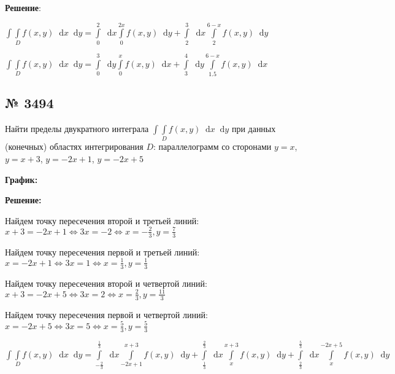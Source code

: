 \documentclass{article}
\newcommand*\diff{\mathop{}\!\mathrm{d}}
\begin{document}
\textbf{Решение}:

$\int\int\limits_{D} f(x, y) \diff x \diff y = \int\limits_{0}^{2} \diff x \int\limits_{0}^{2x} f(x, y) \diff y + \int\limits_{2}^{3} \diff x \int\limits_{2}^{6-x} f(x, y) \diff y$

$\int\int\limits_{D} f(x, y) \diff x \diff y = \int\limits_{0}^{3} \diff y \int\limits_{0}^{x} f(x, y) \diff x + \int\limits_{3}^{4} \diff y \int\limits_{1.5}^{6-x} f(x, y) \diff x$

\subsection{№ 3494}

Найти пределы двукратного интеграла $\int\int\limits_{D} f(x, y) \diff x \diff y$ при данных (конечных) областях интегрирования $D$: параллелограмм со сторонами $y = x$, $y = x + 3$, $y = -2x + 1$, $y = -2x + 5$

\textbf{График:}


\textbf{Решение:}

Найдем точку пересечения второй и третьей линий: $x + 3 = -2x + 1 \Longleftrightarrow 3x = -2 \Longleftrightarrow x = -\frac{2}{3}, y = \frac{7}{3}$

Найдем точку пересечения первой и третьей линий: $x = -2x + 1 \Longleftrightarrow 3x = 1 \Longleftrightarrow x = \frac{1}{3}, y = \frac{1}{3}$

Найдем точку пересечения второй и четвертой линий: $x + 3 = -2x + 5 \Longleftrightarrow 3x = 2 \Longleftrightarrow x = \frac{2}{3}, y = \frac{11}{3}$

Найдем точку пересечения первой и четвертой линий: $x = -2x + 5 \Longleftrightarrow 3x = 5 \Longleftrightarrow x = \frac{5}{3}, y = \frac{5}{3}$

$\int\int\limits_{D} f(x, y) \diff x \diff y = \int\limits_{-\frac{2}{3}}^{\frac{1}{3}} \diff x \int\limits_{-2x+1}^{x+3} f(x, y) \diff y + \int\limits_{\frac{1}{3}}^{\frac{2}{3}} \diff x \int\limits_{x}^{x+3} f(x, y) \diff y + \int\limits_{\frac{2}{3}}^{\frac{5}{3}} \diff x \int\limits_{x}^{-2x+5} f(x, y) \diff y$
\end{document}
